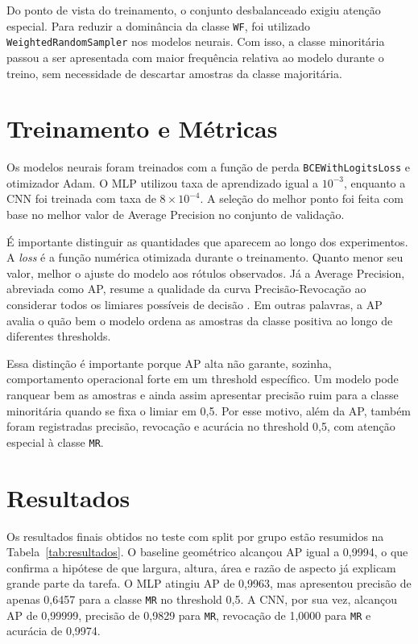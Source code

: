 \documentclass[12pt]{article}
\begin{document}
Do ponto de vista do treinamento, o conjunto desbalanceado exigiu atenção
especial. Para reduzir a dominância da classe \texttt{WF}, foi utilizado
\texttt{WeightedRandomSampler} nos modelos neurais. Com isso, a classe
minoritária passou a ser apresentada com maior frequência relativa ao modelo
durante o treino, sem necessidade de descartar amostras da classe majoritária.

\section{Treinamento e Métricas}

Os modelos neurais foram treinados com a função de perda
\texttt{BCEWithLogitsLoss} e otimizador Adam. O MLP utilizou taxa de aprendizado
igual a $10^{-3}$, enquanto a CNN foi treinada com taxa de $8 \times 10^{-4}$.
A seleção do melhor ponto foi feita com base no melhor valor de Average
Precision no conjunto de validação.

É importante distinguir as quantidades que aparecem ao longo dos experimentos.
A \textit{loss} é a função numérica otimizada durante o treinamento. Quanto
menor seu valor, melhor o ajuste do modelo aos rótulos observados. Já a
Average Precision, abreviada como AP, resume a qualidade da curva
Precisão-Revocação ao considerar todos os limiares possíveis de decisão
\cite{davis2006}. Em outras palavras, a AP avalia o quão bem o modelo ordena
as amostras da classe positiva ao longo de diferentes thresholds.

Essa distinção é importante porque AP alta não garante, sozinha, comportamento
operacional forte em um threshold específico. Um modelo pode ranquear bem as
amostras e ainda assim apresentar precisão ruim para a classe minoritária
quando se fixa o limiar em 0,5. Por esse motivo, além da AP, também foram
registradas precisão, revocação e acurácia no threshold 0,5, com atenção
especial à classe \texttt{MR}.

\section{Resultados}

Os resultados finais obtidos no teste com split por grupo estão resumidos na
Tabela~\ref{tab:resultados}. O baseline geométrico alcançou AP igual a 0,9994,
o que confirma a hipótese de que largura, altura, área e razão de aspecto já
explicam grande parte da tarefa. O MLP atingiu AP de 0,9963, mas apresentou
precisão de apenas 0,6457 para a classe \texttt{MR} no threshold 0,5. A CNN,
por sua vez, alcançou AP de 0,99999, precisão de 0,9829 para \texttt{MR},
revocação de 1,0000 para \texttt{MR} e acurácia de 0,9974.
\end{document}
